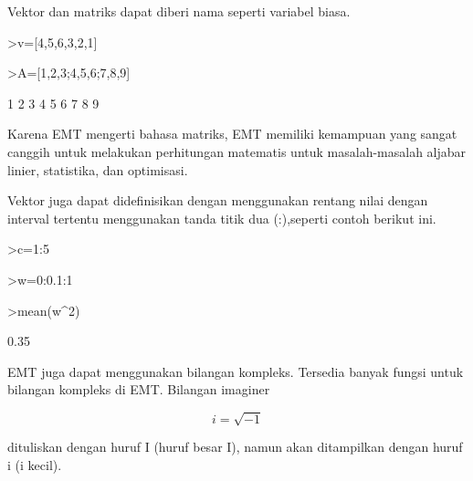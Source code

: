 \documentclass[a4paper,10pt]{article}
\begin{document}
\begin{eulernotebook}
\begin{eulercomment}
\begin{eulercomment}
\begin{eulercomment}
Vektor dan matriks dapat diberi nama seperti variabel biasa.
\end{eulercomment}
\begin{eulerprompt}
>v=[4,5,6,3,2,1]
\end{eulerprompt}
\begin{euleroutput}
  [4,  5,  6,  3,  2,  1]
\end{euleroutput}
\begin{eulerprompt}
>A=[1,2,3;4,5,6;7,8,9]
\end{eulerprompt}
\begin{euleroutput}
              1             2             3 
              4             5             6 
              7             8             9 
\end{euleroutput}
\begin{eulercomment}
Karena EMT mengerti bahasa matriks, EMT memiliki kemampuan yang sangat canggih
untuk melakukan perhitungan matematis untuk masalah-masalah aljabar linier,
statistika, dan optimisasi.

Vektor juga dapat didefinisikan dengan menggunakan rentang nilai dengan interval
tertentu menggunakan tanda titik dua (:),seperti contoh berikut ini.
\end{eulercomment}
\begin{eulerprompt}
>c=1:5
\end{eulerprompt}
\begin{euleroutput}
  [1,  2,  3,  4,  5]
\end{euleroutput}
\begin{eulerprompt}
>w=0:0.1:1
\end{eulerprompt}
\begin{euleroutput}
  [0,  0.1,  0.2,  0.3,  0.4,  0.5,  0.6,  0.7,  0.8,  0.9,  1]
\end{euleroutput}
\begin{eulerprompt}
>mean(w^2)
\end{eulerprompt}
\begin{euleroutput}
  0.35
\end{euleroutput}
\begin{eulercomment}
EMT juga dapat menggunakan bilangan kompleks. Tersedia banyak fungsi untuk
bilangan kompleks di EMT. Bilangan imaginer

\end{eulercomment}
\begin{eulerformula}
\[
i = \sqrt{-1}
\]
\end{eulerformula}
\begin{eulercomment}
dituliskan dengan huruf I (huruf besar I), namun akan ditampilkan dengan huruf i
(i kecil).


\end{eulercomment}
\end{eulercomment}
\end{eulercomment}
\end{eulernotebook}
\end{document}
